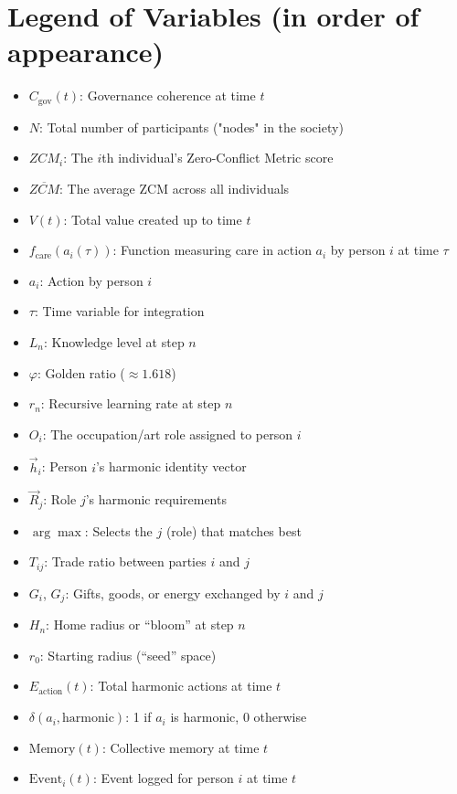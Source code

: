 \documentclass[11pt]{article}
\begin{document}
\section*{Legend of Variables (in order of appearance)}
\begin{itemize}
    \item $C_{\text{gov}}(t)$: Governance coherence at time $t$
    \item $N$: Total number of participants ("nodes" in the society)
    \item $ZCM_i$: The $i$th individual’s Zero-Conflict Metric score
    \item $\overline{ZCM}$: The average ZCM across all individuals
    \item $V(t)$: Total value created up to time $t$
    \item $f_{\text{care}}(a_i(\tau))$: Function measuring care in action $a_i$ by person $i$ at time $\tau$
    \item $a_i$: Action by person $i$
    \item $\tau$: Time variable for integration
    \item $L_n$: Knowledge level at step $n$
    \item $\varphi$: Golden ratio ($\approx 1.618$)
    \item $r_n$: Recursive learning rate at step $n$
    \item $O_i$: The occupation/art role assigned to person $i$
    \item $\vec{h}_i$: Person $i$’s harmonic identity vector
    \item $\vec{R}_j$: Role $j$’s harmonic requirements
    \item $\arg\max$: Selects the $j$ (role) that matches best
    \item $T_{ij}$: Trade ratio between parties $i$ and $j$
    \item $G_i$, $G_j$: Gifts, goods, or energy exchanged by $i$ and $j$
    \item $H_n$: Home radius or “bloom” at step $n$
    \item $r_0$: Starting radius (“seed” space)
    \item $E_{\text{action}}(t)$: Total harmonic actions at time $t$
    \item $\delta(a_i, \text{harmonic})$: 1 if $a_i$ is harmonic, 0 otherwise
    \item $\text{Memory}(t)$: Collective memory at time $t$
    \item $\text{Event}_i(t)$: Event logged for person $i$ at time $t$

\end{itemize}
\end{document}
